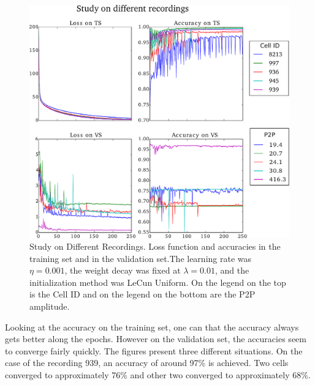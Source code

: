 \documentclass[10pt]{article}
\begin{document}
\begin{figure}[!Ht]
	\centering
	\includegraphics[width=0.8\linewidth]{study_on_different_cells_v2.pdf}
	\caption{Study on Different Recordings. Loss function and accuracies in the training set and in the validation set.The learning rate was $\eta = 0.001$, the weight decay was fixed at $\lambda = 0.01$, and the initialization method was LeCun Uniform. On the legend on the top is the Cell ID and on the legend on the bottom are the P2P amplitude.
}
\label{fig:study-cells}
\end{figure}

Looking at the accuracy on the training set, one can that the accuracy always gets better along the epochs. However on the validation set, the accuracies seem to converge fairly quickly.
The figures present three different situations. On the case of the recording 939, an accuracy of around 97\% is achieved. Two cells converged to approximately 76\% and other two converged to approximately 68\%. 



\end{document}
